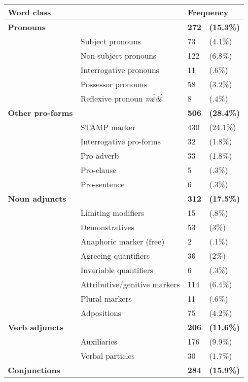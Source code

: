 \iffalse

\begin{table} 
\centering
\small
\begin{tabular}{ll|ll}
 \midrule
  \multicolumn{2}{l}{Word class} &  \multicolumn{2}{l}{Frequency}  \\ %
 \midrule
 {\bfseries Pronouns}  &  & {\bfseries 272} & {\bfseries (15.3\%)} \\ %
  & Subject pronouns  & 73 & (4.1\%) \\
  & Non-subject pronouns  & 122 & (6.8\%) \\
  & Interrogative pronouns  &  11 & (.6\%) \\
  & Possessor pronouns  & 58 & (3.2\%) \\
  & Reflexive pronoun {\itshape mɛ́dɛ́}  & 8 & (.4\%) \\
 {\bfseries Other pro-forms} &   & {\bfseries 506} & {\bfseries (28.4\%)} \\
  & STAMP marker  & 430 & (24.1\%) \\
  & Interrogative pro-forms  & 32  & (1.8\%) \\
  & Pro-adverb & 33 & (1.8\%) \\
  & Pro-clause &  5 & (.3\%) \\
  & Pro-sentence & 6 & (.3\%) \\
 {\bfseries Noun adjuncts} &  & {\bfseries 312} & {\bfseries (17.5\%)} \\
 & Limiting modifiers  &  15 & (.8\%) \\
 & Demonstratives  & 53  & (3\%) \\
 & Anaphoric marker (free)  & 2 & (.1\%) \\ %
 & Agreeing quantifiers   & 36 & (2\%) \\
 & Invariable quantifiers   & 6 & (.3\%) \\
 & Attributive/genitive markers   & 114  & (6.4\%) \\
 & Plural markers  & 11 & (.6\%) \\
 & Adpositions   & 75 & (4.2\%) \\
 {\bfseries Verb adjuncts} &  & {\bfseries 206} & {\bfseries (11.6\%)} \\
 & Auxiliaries   &  176 & (9.9\%) \\
 & Verbal particles   & 30 & (1.7\%) \\
 {\bfseries Conjunctions} &  & {\bfseries 284} & {\bfseries (15.9\%)} \\

\end{tabular}
\end{table}

